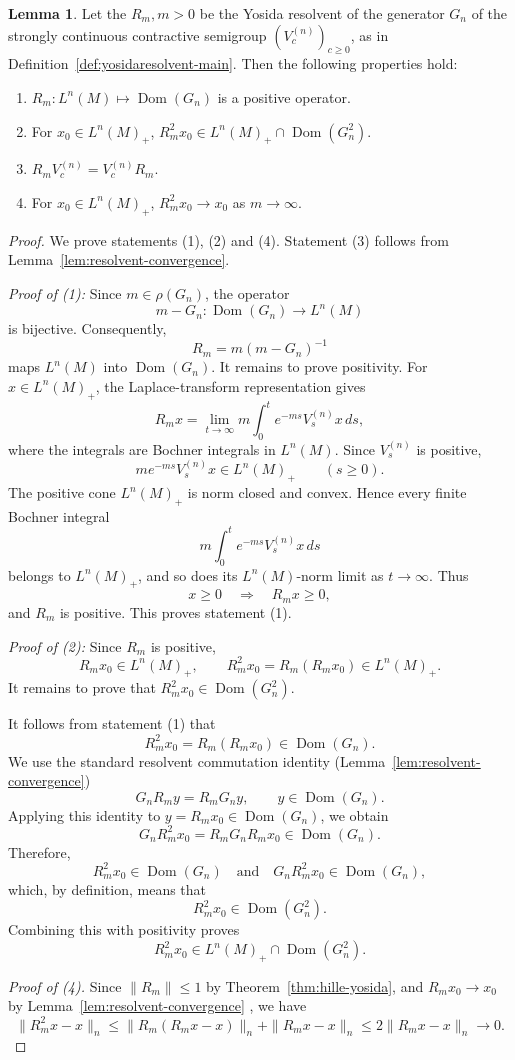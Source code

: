 \documentclass[11pt,a4paper]{article}
\theoremstyle{plain}
\numberwithin{theorem}{section}
\theoremstyle{definition}
\newtheorem{lemma}[theorem]{Lemma}
\newcommand{\?}{\overset{?}{=}}
\DeclareMathOperator{\Dom}{Dom}
\begin{document}
\begin{lemma}\label{lem:yosidaproperties}
    Let the $R_m, m>0$ be the Yosida resolvent of the generator $G_n$ of the strongly continuous contractive semigroup $(V_c^{(n)})_{c\geq0}$, as in Definition~\ref{def:yosidaresolvent-main}. Then the following properties hold:
    \begin{enumerate}
        \item $R_m:L^n(M) \longmapsto \Dom(G_n)$ is a positive operator.
        \item For $x_0\in L^n(M)_+$, $R_m^2 x_0\in L^n(M)_+\cap \Dom(G_n^2)$.
        \item $R_m V_c^{(n)}=V_c^{(n)} R_m$.
        \item For $x_0\in L^n(M)_+$, $R_m^2x_0 \to x_0 $ as $m\to \infty$.
    \end{enumerate}
\end{lemma}
\begin{proof}
We prove statements (1), (2) and (4). Statement (3) follows from Lemma~\ref{lem:resolvent-convergence}.

\emph{Proof of (1):}
Since \(m\in\rho(G_n)\), the operator
\[
m-G_n:\Dom(G_n)\longrightarrow L^n(M)
\]
is bijective. Consequently,
\[
R_m=m(m-G_n)^{-1}
\]
maps \(L^n(M)\) into \(\Dom(G_n)\).
It remains to prove positivity. For \(x\in L^n(M)_+\), the Laplace-transform
representation gives
\[
R_mx
   =\lim_{t\to\infty}
      m\int_0^t e^{-ms}V_s^{(n)}x\,ds,
\]
where the integrals are Bochner integrals in \(L^n(M)\). Since
\(V_s^{(n)}\) is positive,
\[
m e^{-ms}V_s^{(n)}x\in L^n(M)_+
\qquad (s\geq0).
\]
The positive cone \(L^n(M)_+\) is norm closed and convex. Hence every
finite Bochner integral
\[
m\int_0^t e^{-ms}V_s^{(n)}x\,ds
\]
belongs to \(L^n(M)_+\), and so does its \(L^n(M)\)-norm limit as
\(t\to\infty\). Thus
\[
x\geq0\quad\Longrightarrow\quad R_mx\geq0,
\]
and \(R_m\) is positive. This proves statement (1).

\emph{Proof of (2):}
Since \(R_m\) is positive,
\[
R_mx_0\in L^n(M)_+,
\qquad
R_m^2x_0=R_m(R_mx_0)\in L^n(M)_+.
\]
It remains to prove that \(R_m^2x_0\in\Dom(G_n^2)\).

It follows from statement (1) that
\[
R_m^2x_0= R_m(R_mx_0)\in\Dom(G_n).
\]
We  use the standard resolvent commutation identity (Lemma~\ref{lem:resolvent-convergence})
\[
G_nR_my=R_mG_ny,
\qquad y\in\Dom(G_n).
\]
Applying this identity to \(y=R_mx_0\in\Dom(G_n)\), we obtain
\[
G_nR_m^2x_0
   =R_mG_nR_mx_0 \in \Dom(G_n).
\]
Therefore,
\[
R_m^2x_0\in\Dom(G_n)
\quad\text{and}\quad
G_nR_m^2x_0\in\Dom(G_n),
\]
which, by definition, means that
\[
R_m^2x_0\in\Dom(G_n^2).
\]
Combining this with positivity proves
\[
R_m^2x_0\in L^n(M)_+\cap\Dom(G_n^2).
\]

\emph{Proof of (4).}
Since \(\|R_m\|\leq1\) by Theorem~\ref{thm:hille-yosida}, and \(R_m x_0\to x_0\) by Lemma~\ref{lem:resolvent-convergence} , we have
\[
 \|R_m^2x-x\|_n
 \leq
 \|R_m(R_mx-x)\|_n+\|R_mx-x\|_n
 \leq
 2\|R_mx-x\|_n
 \longrightarrow0.
\]
\end{proof}
\end{document}
